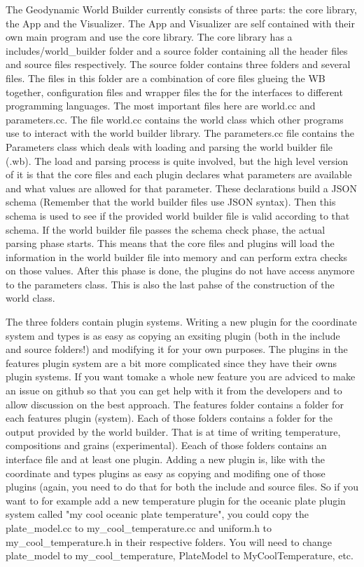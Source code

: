 \documentclass{book}
\newcommand{\GWB}{{Geodynamic World Builder}}
\begin{document}
The \GWB{} currently consists of three parts: the core library, the App and the Visualizer. The App and Visualizer are self contained
with their own main program and use the core library. The core library has a includes/world\_builder folder and a source folder containing
all the header files and source files respectively. The source folder contains three folders and several files. The files in this folder are a 
combination of core files glueing the WB together, configuration files and wrapper files the for the interfaces to different programming languages.
The most important files here are world.cc and parameters.cc. The file world.cc contains the world class which other programs use to interact with 
the world builder library. The parameters.cc file contains the Parameters class which deals with loading and parsing the world builder file (.wb). 
The load and parsing process is quite involved, but the high level version of it is that the core files and each plugin declares what parameters are 
available and what values are allowed for that parameter. These declarations build a JSON schema (Remember that the world builder files use JSON syntax).
Then this schema is used to see if the provided world builder file is valid according to that schema. If the world builder file passes the schema check 
phase, the actual parsing phase starts. This means that the core files and plugins will load the information in the world builder file into memory and
can perform extra checks on those values. After this phase is done, the plugins do not have access anymore to the parameters class. This is also the 
last pahse of the construction of the world class.

The three folders contain plugin systems. Writing a new plugin for the coordinate system and types is as easy as copying an exsiting plugin (both in the 
include and source folders!) and modifying it for your own purposes. The plugins in the features plugin system are a bit more complicated since they have 
their owns plugin systems. If you want tomake a whole new feature you are adviced to make an issue on github so that you can get help with it from the 
developers and to allow discussion on the best approach. The features folder contains a folder for each features plugin (system). Each of those folders 
contains a folder for the output provided by the world builder. That is at time of writing temperature, compositions and grains (experimental). Eeach of 
those folders contains an interface file and at least one plugin. Adding a new plugin is, like with the coordinate and types plugins as easy as copying 
and modifing one of those plugins (again, you need to do that for both the include and source files. So if you want to for example add a new temperature 
plugin for the oceanic plate plugin system called "my cool oceanic plate temperature", you could copy the plate\_model.cc to my\_cool\_temperature.cc and 
uniform.h to my\_cool\_temperature.h in their respective folders. You will need to change plate\_model to my\_cool\_temperature, PlateModel to MyCoolTemperature,
etc.
\end{document}
